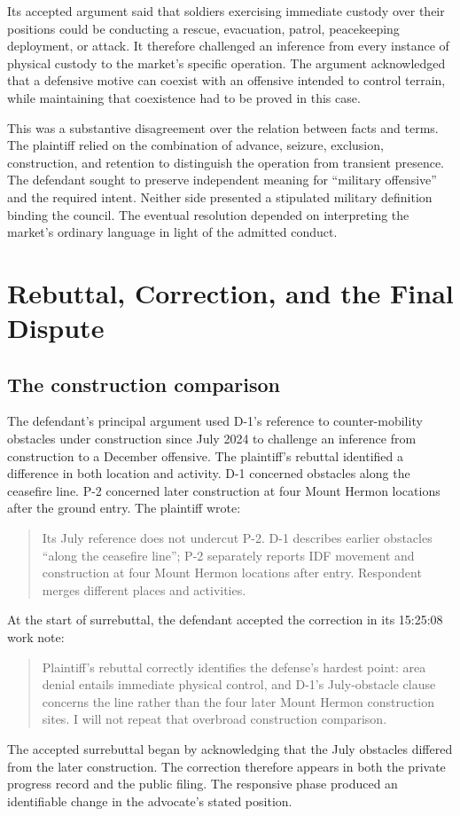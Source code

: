 \documentclass[11pt]{article}
\begin{document}
Its accepted argument said that soldiers exercising immediate custody over their positions could be conducting a rescue, evacuation, patrol, peacekeeping deployment, or attack.  It therefore challenged an inference from every instance of physical custody to the market's specific operation.  The argument acknowledged that a defensive motive can coexist with an offensive intended to control terrain, while maintaining that coexistence had to be proved in this case.

This was a substantive disagreement over the relation between facts and terms.  The plaintiff relied on the combination of advance, seizure, exclusion, construction, and retention to distinguish the operation from transient presence.  The defendant sought to preserve independent meaning for ``military offensive'' and the required intent.  Neither side presented a stipulated military definition binding the council.  The eventual resolution depended on interpreting the market's ordinary language in light of the admitted conduct.

\section{Rebuttal, Correction, and the Final Dispute}

\subsection{The construction comparison}

The defendant's principal argument used D-1's reference to counter-mobility obstacles under construction since July 2024 to challenge an inference from construction to a December offensive.  The plaintiff's rebuttal identified a difference in both location and activity.  D-1 concerned obstacles along the ceasefire line.  P-2 concerned later construction at four Mount Hermon locations after the ground entry.  The plaintiff wrote:
\begin{quote}
Its July reference does not undercut P-2. D-1 describes earlier obstacles ``along the ceasefire line''; P-2 separately reports IDF movement and construction at four Mount Hermon locations after entry. Respondent merges different places and activities.
\end{quote}

At the start of surrebuttal, the defendant accepted the correction in its 15:25:08 work note:
\begin{quote}
Plaintiff's rebuttal correctly identifies the defense's hardest point: area denial entails immediate physical control, and D-1's July-obstacle clause concerns the line rather than the four later Mount Hermon construction sites. I will not repeat that overbroad construction comparison.
\end{quote}
The accepted surrebuttal began by acknowledging that the July obstacles differed from the later construction.  The correction therefore appears in both the private progress record and the public filing.  The responsive phase produced an identifiable change in the advocate's stated position.
\end{document}
